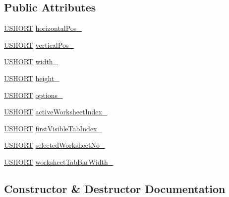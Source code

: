 \subsection*{Public Attributes}
\begin{DoxyCompactItemize}
\item 
\hyperlink{_basic_excel_8hpp_a5850d5316caf7f4cedd742fdf8cd7c02}{U\+S\+H\+O\+R\+T} \hyperlink{struct_y_excel_1_1_workbook_1_1_window1_ab746e4c1ea8592a4dc374671870c0ed5}{horizontal\+Pos\+\_\+}
\item 
\hyperlink{_basic_excel_8hpp_a5850d5316caf7f4cedd742fdf8cd7c02}{U\+S\+H\+O\+R\+T} \hyperlink{struct_y_excel_1_1_workbook_1_1_window1_a1a712d55abf64c50635574b80e1b554e}{vertical\+Pos\+\_\+}
\item 
\hyperlink{_basic_excel_8hpp_a5850d5316caf7f4cedd742fdf8cd7c02}{U\+S\+H\+O\+R\+T} \hyperlink{struct_y_excel_1_1_workbook_1_1_window1_ae53e443e115c330f6b62c096f89ac07b}{width\+\_\+}
\item 
\hyperlink{_basic_excel_8hpp_a5850d5316caf7f4cedd742fdf8cd7c02}{U\+S\+H\+O\+R\+T} \hyperlink{struct_y_excel_1_1_workbook_1_1_window1_a0c4cc09ca5d75bd32acf0b6a8ca6cd6a}{height\+\_\+}
\item 
\hyperlink{_basic_excel_8hpp_a5850d5316caf7f4cedd742fdf8cd7c02}{U\+S\+H\+O\+R\+T} \hyperlink{struct_y_excel_1_1_workbook_1_1_window1_ab464e60092849a728af429556f1d046c}{options\+\_\+}
\item 
\hyperlink{_basic_excel_8hpp_a5850d5316caf7f4cedd742fdf8cd7c02}{U\+S\+H\+O\+R\+T} \hyperlink{struct_y_excel_1_1_workbook_1_1_window1_a2568bc099b6941f2406fa4337f7d3ba6}{active\+Worksheet\+Index\+\_\+}
\item 
\hyperlink{_basic_excel_8hpp_a5850d5316caf7f4cedd742fdf8cd7c02}{U\+S\+H\+O\+R\+T} \hyperlink{struct_y_excel_1_1_workbook_1_1_window1_a7b3699a59c7c37b62e28497b854a047e}{first\+Visible\+Tab\+Index\+\_\+}
\item 
\hyperlink{_basic_excel_8hpp_a5850d5316caf7f4cedd742fdf8cd7c02}{U\+S\+H\+O\+R\+T} \hyperlink{struct_y_excel_1_1_workbook_1_1_window1_a3ec4bdccf053328237e174edd3ec7ec5}{selected\+Worksheet\+No\+\_\+}
\item 
\hyperlink{_basic_excel_8hpp_a5850d5316caf7f4cedd742fdf8cd7c02}{U\+S\+H\+O\+R\+T} \hyperlink{struct_y_excel_1_1_workbook_1_1_window1_a0f760500274942653d88dfcbcabc7586}{worksheet\+Tab\+Bar\+Width\+\_\+}
\end{DoxyCompactItemize}


\subsection{Constructor \& Destructor Documentation}
\hypertarget{struct_y_excel_1_1_workbook_1_1_window1_ab1ff3a128cca55bd5b819072e9b03705}{}
